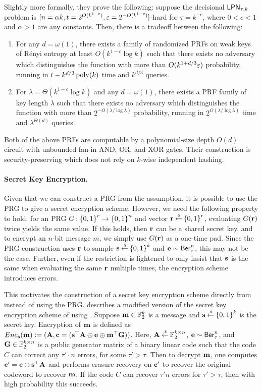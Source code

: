 Slightly more formally, they prove the following: suppose the decisional $\mathsf{LPN}_{\tau,k}$ problem is $[n=\alpha k, t=2^{O(k^{1-c})}, \varepsilon=2^{-O(k^{1-c})}]$-hard for $\tau = k^{-c}$, where $0 < c < 1$ and $\alpha > 1$ are any constants.
Then, there is a tradeoff between the following:
\begin{enumerate}
	\item For any $d = \omega(1)$, there exists a family of randomized PRFs on weak keys of R\'{e}nyi entropy at least $O(k^{1-c}\log k)$ such that there exists no adversary which distinguishes the function with more than $O(k^{1+d/3}\varepsilon)$ probability, running in $t-k^{d/3}\operatorname{poly}(k)$ time and $k^{d/3}$ queries.
	
	\item For $\lambda = \Theta(k^{1-c}\log k)$ and any $d = \omega(1)$, there exists a PRF family of key length $\lambda$ such that there exists no adversary which distinguishes the function with more than $2^{-O(\lambda/\log \lambda)}$ probability, running in $2^{O(\lambda/\log\lambda)}$ time and $\lambda^{\Theta(d)}$ queries.
\end{enumerate}
Both of the above PRFs are computable by a polynomial-size depth $O(d)$ circuit with unbounded fan-in AND, OR, and XOR gates.
Their construction is security-preserving which does not rely on $k$-wise independent hashing.

\paragraph{Secret Key Encryption.} Given that we can construct a PRG from the \LPN assumption, it is possible to use the PRG to give a secret encryption scheme.
However, we need the following property to hold: for an \LPN PRG $G \colon {\{0,1\}}^r \rightarrow {\{0,1\}}^n$ and vector ${\mathbf r} \mathbin{\stackrel{\mbox{\,\tiny \$}}{\gets}} {\{0,1\}}^r$, evaluating $G({\mathbf r})$ twice yields the same value.
If this holds, then ${\mathbf r}$ can be a shared secret key, and to encrypt an $n$-bit message $m$, we simply use $G({\mathbf r})$ as a one-time pad.
Since the PRG construction uses ${\mathbf r}$ to sample ${\mathbf s} \mathbin{\stackrel{\mbox{\,\tiny \$}}{\gets}} {\{0,1\}}^k$ and ${\mathbf e} \sim \mathsf{Ber}_\tau^n$, this may not be the case.
Further, even if the restriction is lightened to only insist that ${\mathbf s}$ is the same when evaluating the same ${\mathbf r}$ multiple times, the encryption scheme introduces errors.

This motivates the construction of a secret key encryption scheme directly from \LPN instead of using the \LPN PRG.
\cite{Piet12} describes a modified version of the secret key encryption scheme of \cite{ICALP:GilRobSeu08} using \LPN.
Suppose ${\mathbf m} \in {\mathbb F}_2^k$ is a message and ${\mathbf s} \mathbin{\stackrel{\mbox{\,\tiny \$}}{\gets}} {\{0,1\}}^k$ is the secret key.
Encryption of ${\mathbf m}$ is defined as $Enc_{\mathbf s}({\mathbf m}) {\;\vcentcolon=\;} ({\mathbf A}, {\mathbf c} = ({\mathbf s}^\top{\mathbf A} \oplus {\mathbf e} \oplus {\mathbf m}^\top{\mathbf G}))$.
Here, ${\mathbf A} \mathbin{\stackrel{\mbox{\,\tiny \$}}{\gets}} {\mathbb F}_2^{k\times n}$, ${\mathbf e} \sim \mathsf{Ber}_\tau^n$, and ${\mathbf G} \in {\mathbb F}_2^{k\times n}$ is a public generator matrix of a binary linear code such that the code $C$ can correct any $\tau'\cdot n$ errors, for some $\tau' > \tau$.
Then to decrypt ${\mathbf m}$, one computes ${\mathbf c}' = {\mathbf c} \oplus {\mathbf s}^\top {\mathbf A}$ and performs erasure recovery on ${\mathbf c}'$ to recover the original codeword to recover ${\mathbf m}$.
If the code $C$ can recover $\tau' n$ errors for $\tau' > \tau$, then with high probability this succeeds.

